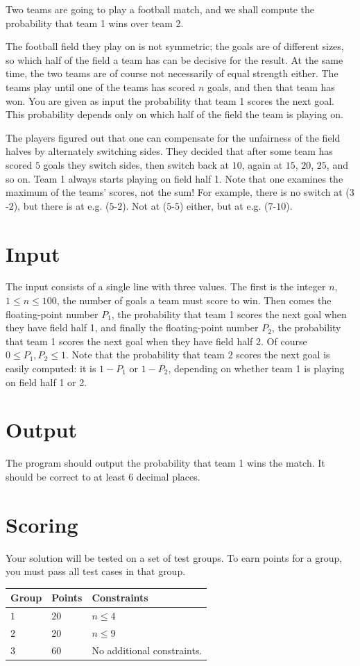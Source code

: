 
Two teams are going to play a football match, and we shall compute the probability that team 1 wins over team 2.

The football field they play on is not symmetric; the goals are of different sizes, so which half of the field a team has can be decisive for the result. At the same time, the two teams are of course not necessarily of equal strength either. The teams play until one of the teams has scored $n$ goals, and then that team has won. You are given as input the probability that team 1 scores the next goal. This probability depends only on which half of the field the team is playing on.

The players figured out that one can compensate for the unfairness of the field halves by alternately switching sides. They decided that after some team has scored $5$ goals they switch sides, then switch back at $10$, again at $15$, $20$, $25$, and so on. Team 1 always starts playing on field half 1. Note that one examines the maximum of the teams' scores, not the sum! For example, there is no switch at ($3$-$2$), but there is at e.g. ($5$-$2$). Not at ($5$-$5$) either, but at e.g. ($7$-$10$).

\section*{Input}
The input consists of a single line with three values. The first is the integer $n$, $1 \leq n \leq 100$, the number of goals a team must score to win. Then comes the floating-point number $P_1$, the probability that team 1 scores the next goal when they have field half 1, and finally the floating-point number $P_2$, the probability that team 1 scores the next goal when they have field half 2. Of course $0 \leq P_1, P_2 \leq 1$. Note that the probability that team 2 scores the next goal is easily computed: it is $1 - P_1$ or $1 - P_2$, depending on whether team 1 is playing on field half 1 or 2.

\section*{Output}
The program should output the probability that team 1 wins the match. It should be correct to at least $6$ decimal places.

\section*{Scoring}
Your solution will be tested on a set of test groups.
To earn points for a group, you must pass all test cases in that group.


\noindent
\begin{tabular}{| l | l | p{12cm} |}
  \hline
  \textbf{Group} & \textbf{Points} & \textbf{Constraints} \\ \hline
  $1$    & $20$          & $n \leq 4$  \\ \hline
  $2$    & $20$          & $n \leq 9$  \\ \hline
  $3$    & $60$          & No additional constraints.  \\ \hline
\end{tabular}
